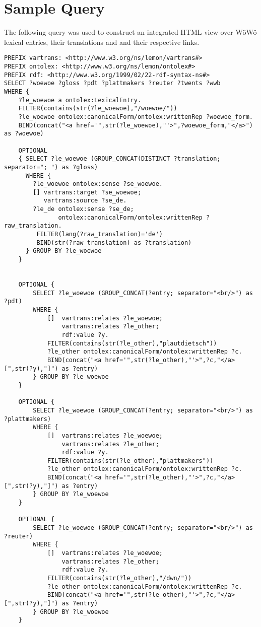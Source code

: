 \section{Sample Query}
\label{appendix-sparql}

The following query was used to construct an integrated HTML view over WöWö lexical entries, their translations and and their respective links.

\begin{verbatim}
PREFIX vartrans: <http://www.w3.org/ns/lemon/vartrans#>
PREFIX ontolex: <http://www.w3.org/ns/lemon/ontolex#>
PREFIX rdf: <http://www.w3.org/1999/02/22-rdf-syntax-ns#>
SELECT ?woewoe ?gloss ?pdt ?plattmakers ?reuter ?twents ?wwb
WHERE {
	?le_woewoe a ontolex:LexicalEntry.
	FILTER(contains(str(?le_woewoe),"/woewoe/"))
	?le_woewoe ontolex:canonicalForm/ontolex:writtenRep ?woewoe_form.
	BIND(concat("<a href='",str(?le_woewoe),"'>",?woewoe_form,"</a>") as ?woewoe)
	
	OPTIONAL
	{ SELECT ?le_woewoe (GROUP_CONCAT(DISTINCT ?translation; separator="; ") as ?gloss)
	  WHERE {
	    ?le_woewoe ontolex:sense ?se_woewoe.
	  	[] vartrans:target ?se_woewoe;
	  	   vartrans:source ?se_de.
	  	?le_de ontolex:sense ?se_de;
	  	       ontolex:canonicalForm/ontolex:writtenRep ?raw_translation.
	  	 FILTER(lang(?raw_translation)='de')
	  	 BIND(str(?raw_translation) as ?translation)
	  } GROUP BY ?le_woewoe
	}


	OPTIONAL { 
		SELECT ?le_woewoe (GROUP_CONCAT(?entry; separator="<br/>") as ?pdt)
		WHERE {
			[] 	vartrans:relates ?le_woewoe;
				vartrans:relates ?le_other;
				rdf:value ?y.
			FILTER(contains(str(?le_other),"plautdietsch"))
			?le_other ontolex:canonicalForm/ontolex:writtenRep ?c.
            BIND(concat("<a href='",str(?le_other),"'>",?c,"</a> [",str(?y),"]") as ?entry)
		} GROUP BY ?le_woewoe 
	}

	OPTIONAL { 
		SELECT ?le_woewoe (GROUP_CONCAT(?entry; separator="<br/>") as ?plattmakers)
		WHERE {
			[] 	vartrans:relates ?le_woewoe;
				vartrans:relates ?le_other;
				rdf:value ?y.
			FILTER(contains(str(?le_other),"plattmakers"))
			?le_other ontolex:canonicalForm/ontolex:writtenRep ?c.
            BIND(concat("<a href='",str(?le_other),"'>",?c,"</a> [",str(?y),"]") as ?entry)
		} GROUP BY ?le_woewoe 
	}

	OPTIONAL { 
		SELECT ?le_woewoe (GROUP_CONCAT(?entry; separator="<br/>") as ?reuter)
		WHERE {
			[] 	vartrans:relates ?le_woewoe;
				vartrans:relates ?le_other;
				rdf:value ?y.
			FILTER(contains(str(?le_other),"/dwn/"))
			?le_other ontolex:canonicalForm/ontolex:writtenRep ?c.
            BIND(concat("<a href='",str(?le_other),"'>",?c,"</a> [",str(?y),"]") as ?entry)
		} GROUP BY ?le_woewoe 
	}


\end{verbatim}

